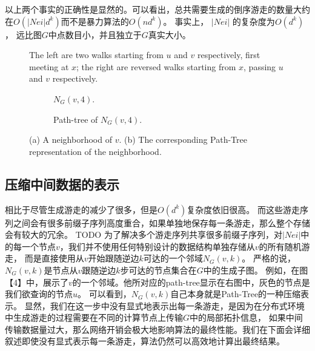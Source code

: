 \documentclass[master]{njuthesis}
\begin{document}
以上两个事实的正确性是显然的。可以看出，总共需要生成的倒序游走的数量大约在$O(|Nei|d^k)$而不是暴力算法的$O(nd^k)$。
事实上， $|Nei|$ 的复杂度为$O(d^k)$， 远比图$G$中点数目小，并且独立于$G$真实大小。

\begin{figure}[t]
\centering
\label{fig:graph1}
\resizebox{!}{!}{}
\caption{The left are two walks starting from $u$ and $v$ respectively, first meeting at $x$; the right are reversed walks starting from $x$, passing $u$ and $v$ respectively.}\label{fig:one}
\end{figure}


\begin{figure}[t]
    \centering
    \begin{subfigure}[b]{0.48\linewidth}        %
        \centering
        \label{fig:two:one}
	\resizebox{!}{!}{}
	\caption{$N_G(v, 4)$.}
	\label{fig:figure2:figure1} 
	\end{subfigure}
    \begin{subfigure}[b]{0.48\linewidth}        %
     \centering
	\resizebox{!}{!}{}
	\caption{Path-tree of $N_G(v, 4)$.}
	\label{fig:figure2:figure2}
    \end{subfigure}
    \caption{(a) A neighborhood of $v $.  (b) The corresponding Path-Tree representation of the neighborhood.}
    \label{fig:two}
\end{figure}

\subsection{压缩中间数据的表示}
相比于尽管生成游走的减少了很多，但是$O(d^k)$复杂度依旧很高。
而这些游走序列之间会有很多前缀子序列高度重合，如果单独地保存每一条游走，那么整个存储会有较大的冗余。
TODO
为了解决多个游走序列共享很多前缀子序列，对$|Nei|$中的每一个节点$v$，我们并不使用任何特别设计的数据结构单独存储从$v$的所有随机游走，
而是直接使用从$v$开始跟随逆边$k$可达的一个邻域$N_{G}(v, k)$。
严格的说，$N_{G}(v, k)$是节点从$v$跟随逆边$k$步可达的节点集合在$G$中的生成子图。
例如，在图【4】中，展示了$v$的一个邻域。他所对应的path-tree显示在右图中，灰色的节点是我们欲查询的节点$u$。
可以看到，$N_{G}(v, k)$自己本身就是Path-Tree的一种压缩表示。
显然，我们在这一步中没有显式地表示出每一条游走，是因为在分布式环境中生成游走的过程需要在不同的计算节点上传输$G$中的局部拓扑信息，
如果中间传输数据量过大，那么网络开销会极大地影响算法的最终性能。我们在下面会详细叙述即使没有显式表示每一条游走，算法仍然可以高效地计算出最终结果。
\end{document}
